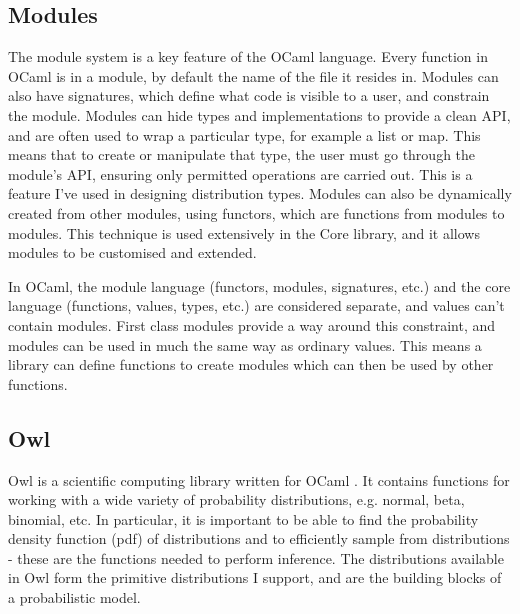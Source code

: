 \documentclass[sigconf]{acmart}
\begin{document}
\begin{figure}[!htb]
  \centering
  \begin{minipage}{0.45\textwidth}
    \centering
  \end{minipage}
  \begin{minipage}{0.45\textwidth}
    \centering
  \end{minipage}
\end{figure}

\subsection{Modules}
The module system is a key feature of the OCaml language. Every function in OCaml is in a module, by default the name of the file it resides in. Modules can also have signatures, which define what code is visible to a user, and constrain the module. Modules can hide types and implementations to provide a clean API, and are often used to wrap a particular type, for example a list or map. This means that to create or manipulate that type, the user must go through the module's API, ensuring only permitted operations are carried out. This is a feature I've used in designing distribution types. Modules can also be dynamically created from other modules, using functors, which are functions from modules to modules. This technique is used extensively in the Core library, and it allows modules to be customised and extended.

In OCaml, the module language (functors, modules, signatures, etc.) and the core language (functions, values, types, etc.) are considered separate, and values can't contain modules. First class modules provide a way around this constraint, and modules can be used in much the same way as ordinary values. This means a library can define functions to create modules which can then be used by other functions.

\subsection{Owl}

Owl is a scientific computing library written for OCaml \cite{owl}. It contains functions for working with a wide variety of probability distributions, e.g. normal, beta, binomial, etc. In particular, it is important to be able to find the probability density function (pdf) of distributions and to efficiently sample from distributions - these are the functions needed to perform inference. The distributions available in Owl form the primitive distributions I support, and are the building blocks of a probabilistic model.
\end{document}
